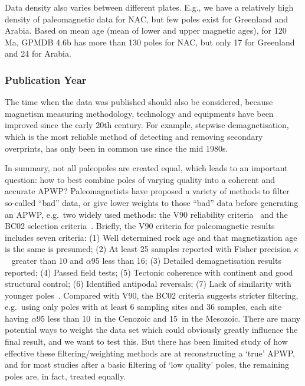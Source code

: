 Data density also varies between different plates. E.g., we have a relatively
high density of paleomagnetic data for NAC, but few poles exist for Greenland
and Arabia. Based on mean age (mean of lower and upper magnetic ages), for
120 Ma, GPMDB 4.6b has more than 130 poles for NAC, but only 17 for
Greenland and 24 for Arabia.

\subsubsection{Publication Year}\label{sec:puby}

The time when the data was published should also be considered, because
magnetism measuring methodology, technology and equipments have been improved
since the early 20th century. For example, stepwise demagnetisation, which is
the most reliable method of detecting and removing secondary overprints, has
only been in common use since the mid 1980s.

In summary, not all paleopoles are created equal, which leads to an important
question: how to best combine poles of varying quality into a coherent and
accurate APWP\@? Paleomagnetists have proposed a variety of methods to filter
so-called ``bad'' data, or give lower weights to those ``bad'' data before
generating an APWP, e.g.\ two widely used methods: the V90 reliability
criteria~\citep{v90} and the BC02 selection criteria~\citep{B02}. Briefly, the
V90 criteria for paleomagnetic results includes seven criteria: (1) Well
determined rock age and that magnetization age is the same is presumed; (2) At
least 25 samples reported with Fisher precision $\kappa$~\citep{F53} greater
than 10 and $\alpha$95 less than 16\degree; (3) Detailed demagnetisation results
reported; (4) Passed field tests; (5) Tectonic coherence with continent and good
structural control; (6) Identified antipodal reversals; (7) Lack of similarity
with younger poles~\citep{T92}. Compared with V90, the BC02 criteria suggests
stricter filtering, e.g.\ using only poles with at least 6 sampling sites and 36
samples, each site having $\alpha$95 less than 10\degree\ in the Cenozoic and
15\degree\ in the Mesozoic. There are many potential ways to weight the data set
which could obviously greatly influence the final result, and we want to test
this. But there has been limited study of how effective these
filtering/weighting methods are at reconstructing a `true' APWP, and for most
studies after a basic filtering of `low quality' poles, the remaining poles are,
in fact, treated equally.

